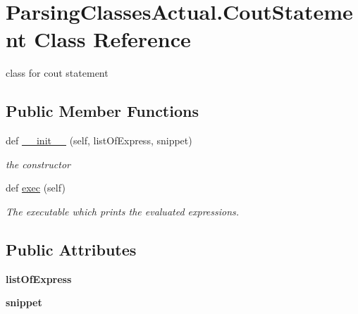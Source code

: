 \hypertarget{class_parsing_classes_actual_1_1_cout_statement}{}\section{Parsing\+Classes\+Actual.\+Cout\+Statement Class Reference}
\label{class_parsing_classes_actual_1_1_cout_statement}


class for cout statement  


\subsection*{Public Member Functions}
\begin{DoxyCompactItemize}
\item 
def \hyperlink{class_parsing_classes_actual_1_1_cout_statement_a0e4930ecbd6e69aac9830659965c4c9c}{\+\_\+\+\_\+init\+\_\+\+\_\+} (self, list\+Of\+Express, snippet)
\begin{DoxyCompactList}\small\item\em the constructor \end{DoxyCompactList}\item 
def \hyperlink{class_parsing_classes_actual_1_1_cout_statement_ad0afd27df037b3f14e777a1f3fa4173e}{exec} (self)\hypertarget{class_parsing_classes_actual_1_1_cout_statement_ad0afd27df037b3f14e777a1f3fa4173e}{}\label{class_parsing_classes_actual_1_1_cout_statement_ad0afd27df037b3f14e777a1f3fa4173e}

\begin{DoxyCompactList}\small\item\em The executable which prints the evaluated expressions. \end{DoxyCompactList}\end{DoxyCompactItemize}
\subsection*{Public Attributes}
\begin{DoxyCompactItemize}
\item 
{\bfseries list\+Of\+Express}\hypertarget{class_parsing_classes_actual_1_1_cout_statement_a7d1d563940af735f9155788a3806edeb}{}\label{class_parsing_classes_actual_1_1_cout_statement_a7d1d563940af735f9155788a3806edeb}

\item 
{\bfseries snippet}\hypertarget{class_parsing_classes_actual_1_1_cout_statement_a6cbedbd0181ff15b696b8a8a6c9e4ef2}{}\label{class_parsing_classes_actual_1_1_cout_statement_a6cbedbd0181ff15b696b8a8a6c9e4ef2}

\end{DoxyCompactItemize}


